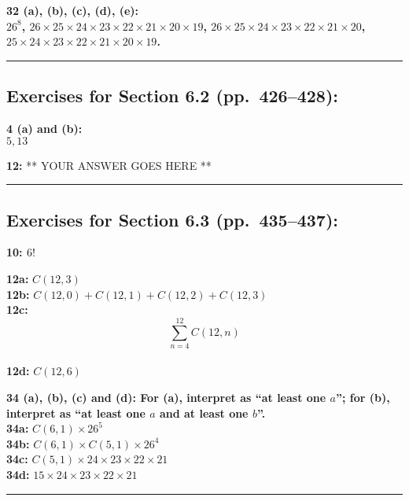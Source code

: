 \documentclass[12pt]{article}  %
\begin{document}
\noindent
{\bf 32 (a), (b), (c), (d), (e):
\\
$26^8$, $26 \times 25 \times 24 \times 23 \times 22 \times 21 \times 20 \times 19$, 
$26 \times 25 \times 24 \times 23 \times 22 \times 21 \times 20$, 
$25 \times 24 \times 23 \times 22 \times 21 \times 20 \times 19$.

\rule{6in}{.1pt}       %


\subsection*{Exercises for Section 6.2 (pp.\ 426--428):}     

\noindent
{\bf 4 (a) and (b):}
\\
$5, 13$

\noindent
{\bf 12:}
** YOUR ANSWER GOES HERE **

\rule{6in}{.1pt}       %


\subsection*{Exercises for Section 6.3 (pp.\ 435--437):}     

\noindent
{\bf 10: $6!$

\noindent
{\bf 12a:} $C(12, 3)$ 
\\
{\bf 12b:} $C(12, 0) + C(12, 1) + C(12, 2) + C(12, 3)$
\\
{\bf 12c:}
\\
\[ \sum_{n=4}^{12} C(12, n) \]
\\
{\bf 12d:} $C(12, 6)$

\noindent
{\bf 34 (a), (b), (c) and (d):  For (a), interpret as ``at least one $a$'';
for (b), interpret as ``at least one $a$ and at least one $b$''.}
\\
{\bf 34a:} $C(6, 1) \times 26^5$
\\
{\bf 34b:} $C(6, 1) \times C(5, 1) \times 26^4$
\\
{\bf 34c:} $C(5, 1) \times 24 \times 23 \times 22 \times 21$
\\
{\bf 34d:} $15 \times 24 \times 23 \times 22 \times 21$


\rule{6in}{.1pt}       %

}}
\end{document}
